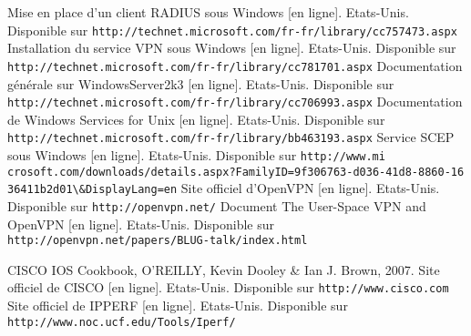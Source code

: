 \renewcommand{\bibname}{Bibliographie}
\renewcommand{\refname}{Bibliographie}

\begin{thebibliography}{Bibliographie}

	 Mise en place d'un client RADIUS sous Windows [en ligne]. Etats-Unis. Disponible sur \verb|http://technet.microsoft.com/fr-fr/library/cc757473.aspx|
	 Installation du service VPN sous Windows [en ligne]. Etats-Unis. Disponible sur \verb|http://technet.microsoft.com/fr-fr/library/cc781701.aspx|
	 Documentation générale sur WindowsServer2k3 [en ligne]. Etats-Unis. Disponible sur \verb|http://technet.microsoft.com/fr-fr/library/cc706993.aspx|
	 Documentation de Windows Services for Unix [en ligne]. Etats-Unis. Disponible sur \verb|http://technet.microsoft.com/fr-fr/library/bb463193.aspx|
	 Service SCEP sous Windows [en ligne]. Etats-Unis. Disponible sur \verb|http://www.mi| \verb|crosoft.com/downloads/details.aspx?FamilyID=9f306763-d036-41d8-8860-16| \verb|36411b2d01\&DisplayLang=en|
	 Site officiel d'OpenVPN [en ligne]. Etats-Unis. Disponible sur \verb|http://openvpn.net/|
	 Document The User-Space VPN and OpenVPN [en ligne]. Etats-Unis. Disponible sur \verb|http://openvpn.net/papers/BLUG-talk/index.html|

	 CISCO IOS Cookbook, O'REILLY, Kevin Dooley \& Ian J. Brown, 2007.
	 Site officiel de CISCO [en ligne]. Etats-Unis. Disponible sur \verb|http://www.cisco.com|
	 Site officiel de IPPERF [en ligne]. Etats-Unis. Disponible sur \verb|http://www.noc.ucf.edu/Tools/Iperf/|
\end{thebibliography}

\pagebreak
